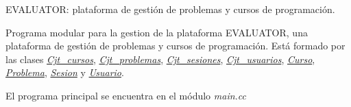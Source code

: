 E\+V\+A\+L\+U\+A\+T\+OR\+: plataforma de gestión de problemas y cursos de programación.

Programa modular para la gestion de la plataforma E\+V\+A\+L\+U\+A\+T\+OR, una plataforma de gestión de problemas y cursos de programación. Está formado por las clases {\itshape \mbox{\hyperlink{class_cjt__cursos}{Cjt\+\_\+cursos}}}, {\itshape \mbox{\hyperlink{class_cjt__problemas}{Cjt\+\_\+problemas}}}, {\itshape \mbox{\hyperlink{class_cjt__sesiones}{Cjt\+\_\+sesiones}}}, {\itshape \mbox{\hyperlink{class_cjt__usuarios}{Cjt\+\_\+usuarios}}}, {\itshape \mbox{\hyperlink{class_curso}{Curso}}}, {\itshape \mbox{\hyperlink{class_problema}{Problema}}}, {\itshape \mbox{\hyperlink{class_sesion}{Sesion}}} y {\itshape \mbox{\hyperlink{class_usuario}{Usuario}}}.

El programa principal se encuentra en el módulo {\itshape main.\+cc} 